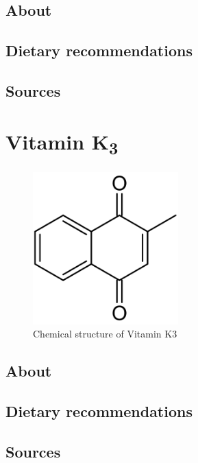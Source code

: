 \documentclass{book}
\begin{document}
\begin{sloppypar}
\section{About}


\section{Dietary recommendations}


\section{Sources}


\chapter{Vitamin K\texorpdfstring{\textsubscript{3}}{3}}
\begin{figure}[h]
	\caption{Chemical structure of Vitamin K3}
	\centering \includegraphics[width=0.5\textwidth]{images/Vitamin_K3_chemical_structure}
\end{figure}
\newpage

\section{About}


\section{Dietary recommendations}


\section{Sources}



\end{sloppypar}
\end{document}

